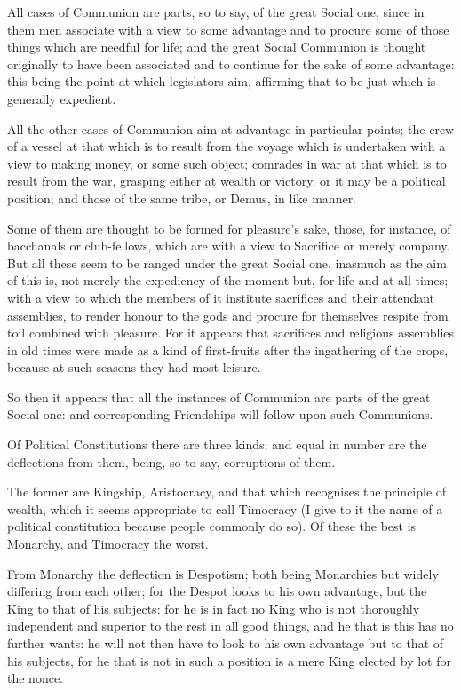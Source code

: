 All cases of Communion are parts, so to say, of the great Social one, since in
them men associate with a view to some advantage and to procure some of those
things which are needful for life; and the great Social Communion is thought
originally to have been associated and to continue for the sake of some
advantage: this being the point at which legislators aim, affirming that to be
just which is generally expedient.

All the other cases of Communion aim at advantage in particular points; the
crew of a vessel at that which is to result from the voyage which is undertaken
with a view to making money, or some such object; comrades in war at that which
is to result from the war, grasping either at wealth or victory, or it may be a
political position; and those of the same tribe, or Demus, in like manner.

Some of them are thought to be formed for pleasure’s sake, those, for
instance, of bacchanals or club-fellows, which are with a view to Sacrifice or
merely company. But all these seem to be ranged under the great Social one,
inasmuch as the aim of this is, not merely the expediency of the moment but,
for life and at all times; with a view to which the members of it institute
sacrifices and their attendant assemblies, to render honour to the gods and
procure for themselves respite from toil combined with pleasure. For it appears
that sacrifices and religious assemblies in old times were made as a kind of
first-fruits after the ingathering of the crops, because at such seasons they
had most leisure.

So then it appears that all the instances of Communion are parts of the great
Social one: and corresponding Friendships will follow upon such Communions.


Of Political Constitutions there are three kinds; and equal in number are the
deflections from them, being, so to say, corruptions of them.

The former are Kingship, Aristocracy, and that which recognises the principle
of wealth, which it seems appropriate to call Timocracy (I give to it the name
of a political constitution because people commonly do so). Of these the best
is Monarchy, and Timocracy the worst.

From Monarchy the deflection is Despotism; both being Monarchies but widely
differing from each other; for the Despot looks to his own advantage, but the
King to that of his subjects: for he is in fact no King who is not thoroughly
independent and superior to the rest in all good things, and he that is this
has no further wants: he will not then have to look to his own advantage but to
that of his subjects, for he that is not in such a position is a mere King
elected by lot for the nonce.

